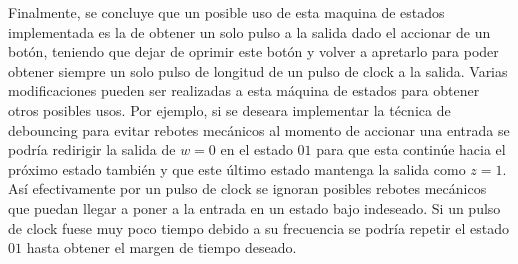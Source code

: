 Finalmente, se concluye que un posible uso de esta maquina de estados implementada es la de obtener un solo pulso a la salida dado el accionar de un botón, teniendo que dejar de oprimir este botón y volver a apretarlo para poder obtener siempre un solo pulso de longitud de un pulso de clock a la salida. Varias modificaciones pueden ser realizadas a esta máquina de estados para obtener otros posibles usos. Por ejemplo, si se deseara implementar la técnica de debouncing para evitar rebotes mecánicos al momento de accionar una entrada se podría redirigir la salida de $w=0$ en el estado $01$ para que esta continúe hacia el próximo estado también y que este último estado mantenga la salida como $z=1$. Así efectivamente por un pulso de clock se ignoran posibles rebotes mecánicos que puedan llegar a poner a la entrada en un estado bajo indeseado. Si un pulso de clock fuese muy poco tiempo debido a su frecuencia se podría repetir el estado $01$ hasta obtener el margen de tiempo deseado.
 

